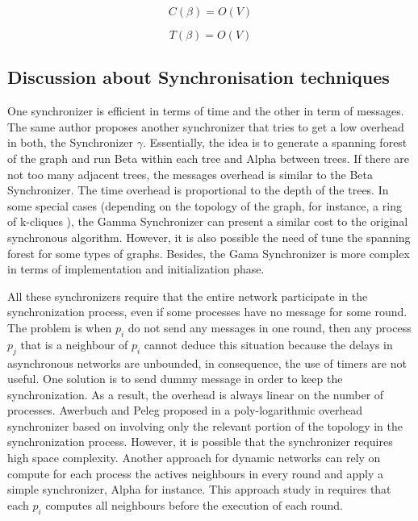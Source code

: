 \begin{equation}
\label{ec:message-beta}
 C(\beta) = O(V)
 \end{equation}

\begin{equation}
\label{ec:time-beta}
 T(\beta) = O(V) 
\end{equation}

\subsection{Discussion about Synchronisation techniques}

One synchronizer is efficient in terms of time and the other in term of messages. The same author proposes \cite{awerbuch1985complexity} another synchronizer that tries to get a low overhead in both, the Synchronizer $\gamma$. Essentially, the idea is to generate a spanning forest of the graph and run Beta within each tree and Alpha between trees. If there are not too many adjacent trees, the messages overhead is similar to the Beta Synchronizer. The time overhead is proportional to the depth of the trees. In some special cases  (depending on the topology of the graph, for instance, a ring of k-cliques \cite{lynch1996distributed}), the Gamma Synchronizer can present a similar cost to the original synchronous algorithm. However, it is also possible the need of tune the spanning forest for some types of graphs. Besides, the Gama Synchronizer is more complex in terms of implementation and initialization phase.

All these synchronizers require that the entire network participate in the synchronization process, even if some processes have no message for some round. The problem is when $p_i$ do not send any messages in one round, then any process $p_j$ that is a neighbour of $p_i$ cannot deduce this situation because the delays in asynchronous networks are unbounded, in consequence, the use of timers are not useful. One solution is  to send dummy message in order to keep the synchronization. As a result, the overhead is always linear on the number of processes. Awerbuch and Peleg proposed in \cite{awerbuch1990network} a poly-logarithmic overhead synchronizer based on involving only the relevant portion of the topology in the synchronization process. However, it is possible that the synchronizer requires high space complexity.  Another approach for dynamic networks can rely on compute for each process the actives neighbours in every round and apply a simple synchronizer, Alpha for instance. This approach study in \cite{AspnesW2007} requires that each $p_i$ computes all neighbours before the execution of each round.

